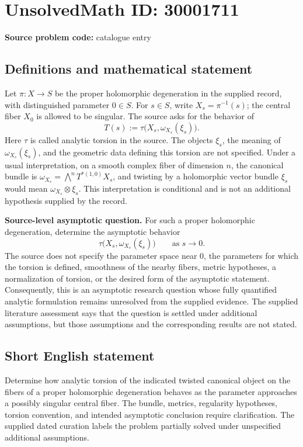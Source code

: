 \documentclass[11pt]{article}
\begin{document}
\section*{UnsolvedMath ID: 30001711}
\textbf{Source problem code:} catalogue entry
\subsection{Definitions and mathematical statement}
Let \(\pi:X\to S\) be the proper holomorphic degeneration in the supplied record, with distinguished parameter \(0\in S\). For \(s\in S\), write \(X_s=\pi^{-1}(s)\); the central fiber \(X_0\) is allowed to be singular. The source asks for the behavior of
\[
T(s):=\tau\bigl(X_s,\omega_{X_s}(\xi_s)\bigr).
\]
Here \(\tau\) is called analytic torsion in the source. The objects \(\xi_s\), the meaning of \(\omega_{X_s}(\xi_s)\), and the geometric data defining this torsion are not specified. Under a usual interpretation, on a smooth complex fiber of dimension \(n\), the canonical bundle is \(\omega_{X_s}=\bigwedge^n T^{*(1,0)}X_s\), and twisting by a holomorphic vector bundle \(\xi_s\) would mean \(\omega_{X_s}\otimes\xi_s\). This interpretation is conditional and is not an additional hypothesis supplied by the record.

\textbf{Source-level asymptotic question.} For such a proper holomorphic degeneration, determine the asymptotic behavior
\[
\tau\bigl(X_s,\omega_{X_s}(\xi_s)\bigr)
\qquad\text{as }s\to0.
\]
The source does not specify the parameter space near \(0\), the parameters for which the torsion is defined, smoothness of the nearby fibers, metric hypotheses, a normalization of torsion, or the desired form of the asymptotic statement. Consequently, this is an asymptotic research question whose fully quantified analytic formulation remains unresolved from the supplied evidence. The supplied literature assessment says that the question is settled under additional assumptions, but those assumptions and the corresponding results are not stated.
\subsection{Short English statement}
Determine how analytic torsion of the indicated twisted canonical object on the fibers of a proper holomorphic degeneration behaves as the parameter approaches a possibly singular central fiber. The bundle, metrics, regularity hypotheses, torsion convention, and intended asymptotic conclusion require clarification. The supplied dated curation labels the problem partially solved under unspecified additional assumptions.
\end{document}
